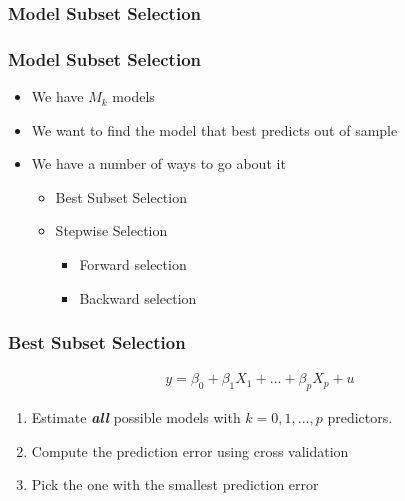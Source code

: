 \documentclass[
  shownotes,
  xcolor={svgnames},
  hyperref={colorlinks,citecolor=DarkBlue,linkcolor=DarkRed,urlcolor=DarkBlue}
  ]{beamer}
\begin{document}
\frametitle{Model Subset Selection}
\begin{frame}[fragile]
\frametitle{Model Subset Selection}

\begin{itemize}
\item We have $M_k$ models 
\bigskip
\item We want to find the model that best predicts out of sample
\bigskip
\item We have a number of ways to go about it
\bigskip
\begin{itemize}
  \item Best Subset Selection
  \medskip
  \item Stepwise Selection
  \begin{itemize}
    \item Forward selection
    \medskip
    \item Backward selection
  \end{itemize}
\end{itemize}
\end{itemize}
\end{frame}


\begin{frame}[fragile]
\frametitle{Best Subset Selection}
\begin{align}
  y = \beta_0 + \beta_1 X_1 + \dots + \beta_p X_p +u
\end{align}

\begin{enumerate}
\item Estimate {\it \bf all} possible models with $k=0,1,..., p$ predictors.
\bigskip
\item Compute the prediction error using cross validation

\bigskip
\item  Pick the one with the smallest prediction error 
\end{enumerate}

\end{frame}
\end{document}
